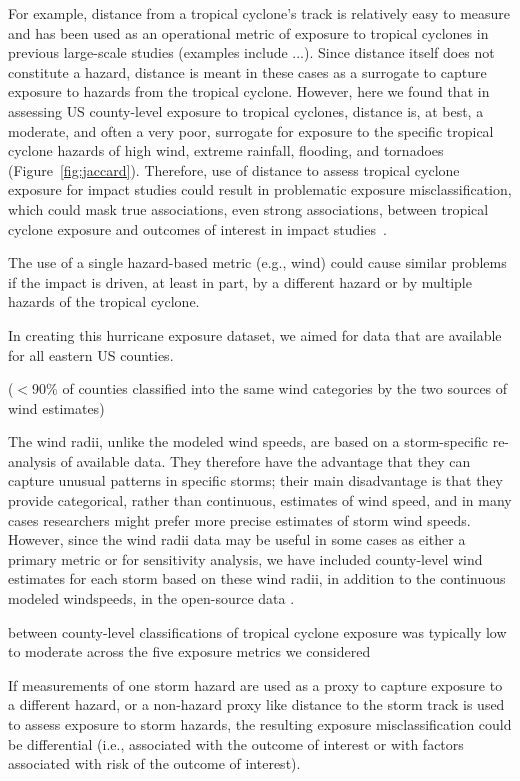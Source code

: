 For example, distance from a tropical cyclone's track is relatively easy to
measure and has been used as an operational metric of exposure to tropical
cyclones in previous large-scale studies (examples include ...). Since distance
itself does not constitute a hazard, distance is meant in these cases as a
surrogate to capture exposure to hazards from the tropical cyclone. However,
here we found that in assessing \ac{US} county-level exposure to tropical
cyclones, distance is, at best, a moderate, and often a very poor, surrogate
for exposure to the specific tropical cyclone hazards of high wind, extreme
rainfall, flooding, and tornadoes (Figure~\ref{fig:jaccard}). Therefore, use of
distance to assess tropical cyclone exposure for impact studies could result in
problematic exposure misclassification, which could mask true associations,
even strong associations, between tropical cyclone exposure and outcomes of
interest in impact studies~\parencite{savitz2016interpreting,
armstrong1998effect}.  

The use of a single hazard-based metric (e.g., wind) could cause similar
problems if the impact is driven, at least in part, by a different hazard or by
multiple hazards of the tropical cyclone.

In creating this hurricane exposure dataset, we aimed for data that are
available for all eastern \ac{US} counties.

($<$90\% of counties classified into the same wind categories by the two
sources of wind estimates)

The wind radii, unlike the modeled wind speeds, are based on a storm-specific
re-analysis of available data. They therefore have the advantage that they can
capture unusual patterns in specific storms; their main disadvantage is that
they provide categorical, rather than continuous, estimates of wind speed, and
in many cases researchers might prefer more precise estimates of storm wind
speeds. However, since the wind radii data may be useful in some cases as
either a primary metric or for sensitivity analysis, we have included
county-level wind estimates for each storm based on these wind radii, in
addition to the continuous modeled windspeeds, in the open-source data
\parencite{hurricaneexposuredata}.

between county-level classifications of tropical cyclone exposure was typically
low to moderate across the  five exposure metrics we considered 

If measurements of one storm hazard are used as a proxy to capture exposure to
a different hazard, or a non-hazard proxy like distance to the storm track is
used to assess exposure to storm hazards, the resulting exposure
misclassification could be differential (i.e., associated with the outcome of
interest or with factors associated with risk of the outcome of interest). 


